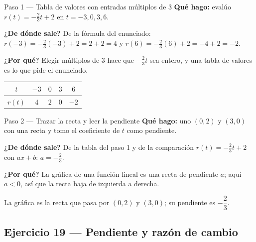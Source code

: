 \documentclass[11pt]{article}
\begin{document}
\begin{paso}{Paso 1 --- Tabla de valores con entradas múltiplos de 3}
\textbf{Qué hago:} evalúo $r(t)=-\tfrac23 t+2$ en $t=-3,0,3,6$.

\textbf{¿De dónde sale?} De la fórmula del enunciado: $r(-3)=-\tfrac23(-3)+2=2+2=4$ y $r(6)=-\tfrac23(6)+2=-4+2=-2$.

\textbf{¿Por qué?} Elegir múltiplos de $3$ hace que $-\tfrac23 t$ sea entero, y una tabla de valores es lo que pide el enunciado.
\begin{center}
\begin{tabular}{c|cccc}
$t$ & $-3$ & $0$ & $3$ & $6$\\ \hline
$r(t)$ & $4$ & $2$ & $0$ & $-2$
\end{tabular}
\end{center}
\end{paso}

\begin{paso}{Paso 2 --- Trazar la recta y leer la pendiente}
\textbf{Qué hago:} uno $(0,2)$ y $(3,0)$ con una recta y tomo el coeficiente de $t$ como pendiente.

\textbf{¿De dónde sale?} De la tabla del paso 1 y de la comparación $r(t)=-\tfrac23 t+2$ con $ax+b$: $a=-\tfrac23$.

\textbf{¿Por qué?} La gráfica de una función lineal es una recta de pendiente $a$; aquí $a<0$, así que la recta baja de izquierda a derecha.
\begin{center}
\end{center}
\end{paso}

\begin{resp}
La gráfica es la recta que pasa por $(0,2)$ y $(3,0)$; su pendiente es $-\dfrac{2}{3}$.
\end{resp}

\subsection*{Ejercicio 19 — Pendiente y razón de cambio}
\end{document}
